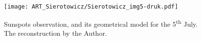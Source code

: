 \begin{artengenv}
\begin{figure}[h]
	\centering
	\texttt{[image: ART\_Sierotowicz/Sierotowicz\_img5-druk.pdf]} 
	\caption{Sunspots observation, and its geometrical model for the 5\textsuperscript{th} July. The reconstruction by the
		Author.}
	\label{sier-fig5}
\end{figure}






%
%
%
%
%
%
%
%
%
%
%
%
%
%
%
%






\end{artengenv}